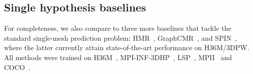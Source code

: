 
\subsection{Single hypothesis baselines}\label{s:single_baselines}
For completeness, we also compare to three more baselines that tackle the standard single-mesh prediction problem:
HMR~\cite{kanazawa18end-to-end}, GraphCMR~\cite{pavlakos18learning}, and SPIN~\cite{kolotouros19learning}, where the latter currently attain state-of-the-art performance on H36M/3DPW. All methods were trained on H36M~\cite{ionescu2013human3}, MPI-INF-3DHP~\cite{mono-3dhp2017}, LSP~\cite{Johnson11}, MPII~\cite{andriluka14cvpr} and COCO~\cite{lin2014microsoft}.

